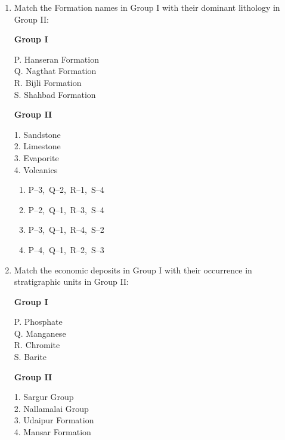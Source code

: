 \documentclass[journal,12pt,onecolumn]{IEEEtran}
\theoremstyle{remark}
\begin{document}
\begin{enumerate}
\item Match the Formation names in Group I with their dominant lithology in Group II:

\begin{multicols}{2}
\textbf{Group I}
\begin{flushleft}
P. Hanseran Formation\\
Q. Nagthat Formation\\
R. Bijli Formation\\
S. Shahbad Formation
\end{flushleft}

\columnbreak

\textbf{Group II}
\begin{flushleft}
1. Sandstone\\
2. Limestone\\
3. Evaporite\\
4. Volcanics
\end{flushleft}
\end{multicols}

\begin{multicols}{2}
\begin{enumerate}
\item P--3,\ Q--2,\ R--1,\ S--4
\item P--2,\ Q--1,\ R--3,\ S--4
\item P--3,\ Q--1,\ R--4,\ S--2
\item P--4,\ Q--1,\ R--2,\ S--3
\end{enumerate}
\end{multicols}


\item Match the economic deposits in Group I with their occurrence in stratigraphic units in Group II:

\begin{multicols}{2}
\textbf{Group I}
\begin{flushleft}
P. Phosphate\\
Q. Manganese\\
R. Chromite\\
S. Barite
\end{flushleft}

\columnbreak

\textbf{Group II}
\begin{flushleft}
1. Sargur Group\\
2. Nallamalai Group\\
3. Udaipur Formation\\
4. Mansar Formation
\end{flushleft}
\end{multicols}


\end{enumerate}
\end{document}

